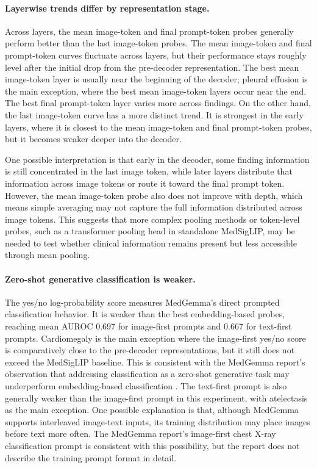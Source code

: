 \documentclass{article}
\begin{document}
\paragraph{Layerwise trends differ by representation stage.}
Across layers, the mean image-token and final prompt-token probes generally perform better than the last image-token probes.
The mean image-token and final prompt-token curves fluctuate across layers, but their performance stays roughly level after the initial drop from the pre-decoder representation.
The best mean image-token layer is usually near the beginning of the decoder; pleural effusion is the main exception, where the best mean image-token layers occur near the end.
The best final prompt-token layer varies more across findings.
On the other hand, the last image-token curve has a more distinct trend.
It is strongest in the early layers, where it is closest to the mean image-token and final prompt-token probes, but it becomes weaker deeper into the decoder.

One possible interpretation is that early in the decoder, some finding information is still concentrated in the last image token, while later layers distribute that information across image tokens or route it toward the final prompt token.
However, the mean image-token probe also does not improve with depth, which means simple averaging may not capture the full information distributed across image tokens.
This suggests that more complex pooling methods or token-level probes, such as a transformer pooling head in standalone MedSigLIP, may be needed to test whether clinical information remains present but less accessible through mean pooling.

\paragraph{Zero-shot generative classification is weaker.}
The yes/no log-probability score measures MedGemma's direct prompted classification behavior.
It is weaker than the best embedding-based probes, reaching mean AUROC 0.697 for image-first prompts and 0.667 for text-first prompts.
Cardiomegaly is the main exception where the image-first yes/no score is comparatively close to the pre-decoder representations, but it still does not exceed the MedSigLIP baseline.
This is consistent with the MedGemma report's observation that addressing classification as a zero-shot generative task may underperform embedding-based classification \citep{medgemma2025}.
The text-first prompt is also generally weaker than the image-first prompt in this experiment, with atelectasis as the main exception.
One possible explanation is that, although MedGemma supports interleaved image-text inputs, its training distribution may place images before text more often.
The MedGemma report's image-first chest X-ray classification prompt is consistent with this possibility, but the report does not describe the training prompt format in detail.
\end{document}
